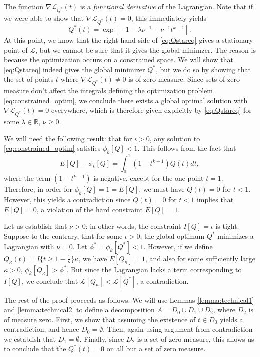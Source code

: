 The function $\nabla \mathcal{L}_{Q^*}(t)$ is a \emph{functional derivative} of the Lagrangian.
Note that if we were able to show that $\nabla \mathcal{L}_{Q^*}(t) = 0$,
this immediately yields
\begin{equation}\label{eq:Qstareq}
Q^*(t) = \exp[-1 -\lambda\nu^{-1} + \nu^{-1}  t^{k-1}].
\end{equation}
At this point, we know that the right-hand side of \eqref{eq:Qstareq}
gives a stationary point of $\mathcal{L}$, but we cannot be sure that
it gives the global minimzer.  The reason is because the optimization
occurs on a constrained space.  We will show that \eqref{eq:Qstareq}
indeed gives the global minimizer $Q^*$, but we do so by showing that
the set of points $t$ where $\nabla \mathcal{L}_{Q^*}(t) \neq 0$ is of
zero measure.  Since sets of zero measure don't affect the integrals
defining the optimization problem \eqref{eq:constrained_optim}, we
conclude there exists a global optimal solution with
$\nabla \mathcal{L}_{Q^*}(t) = 0$ everywhere, which is therefore given
explicitly by \eqref{eq:Qstareq} for some $\lambda \in \mathbb{R}$, $\nu \geq 0.$

We will need the following result: that for $\iota
> 0$, any solution to \eqref{eq:constrained_optim} satisfies
$\phi_k[Q] < 1$.  This follows from the fact that
\[
E[Q] - \phi_k[Q] = \int_0^1 (1-t^{k-1}) Q(t) dt,
\]
where the term $(1-t^{k-1})$ is negative, except for the one point $t
= 1$.  Therefore, in order for $\phi_k[Q] = 1 = E[Q]$, we must have
$Q(t) = 0$ for $t < 1$.  However, this yields a contradiction since
$Q(t) = 0$ for $t < 1$ implies that $E[Q] = 0$, a violation of the
hard constraint $E[Q] = 1$.

Let us establish that $\nu > 0$: in other words, the constraint $I[Q]
= \iota$ is tight.  Suppose to the contrary, that for
some $\iota > 0$, the global optimum $Q^*$ minimizes a Lagrangian with
$\nu = 0$.  Let $\phi^* = \phi_k[Q^*] < 1.$ However, if we define
$Q_\kappa(t) = I\{t \geq 1 - \frac{1}{\kappa}\} \kappa$, we have
$E[Q_\kappa] = 1$, and also for some sufficiently large $\kappa > 0$,
$\phi_k[Q_\kappa] > \phi^*$.  But since the Lagrangian lacks a term
corresponding to $I[Q]$, we conclude that $\mathcal{L}[Q_\kappa]
< \mathcal{L}[Q^*]$, a contradiction.

The rest of the proof proceeds as follows.  We will use
Lemmas \ref{lemma:technical1} and \ref{lemma:technical2} to define a
decomposition $A = D_0 \cup D_1 \cup D_2$, where $D_2$ is of measure
zero.  First, we show that assuming the existence of $t \in D_0$
yields a contradiction, and hence $D_0 = \emptyset$.  Then, again
using argument from contradiction we establish that $D_1 = \emptyset$.
Finally, since $D_2$ is a set of zero measure, this allows us to
conclude that the $Q^*(t) = 0$ on all but a set of zero measure.

